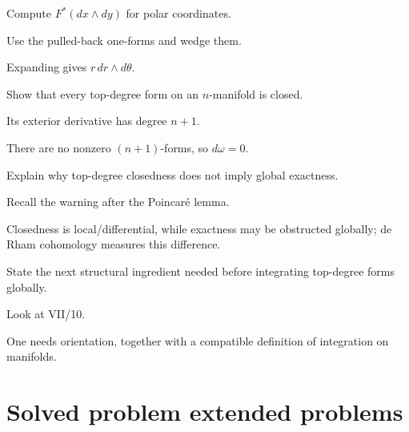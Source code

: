 \begin{exercise}\label{exr:vii09-21}
Compute \(F^*(dx\wedge dy)\) for polar coordinates.
\end{exercise}
\begin{hint}
Use the pulled-back one-forms and wedge them.
\end{hint}
\begin{solution}
Expanding gives \(r\,dr\wedge d\theta\).
\end{solution}

\begin{exercise}\label{exr:vii09-22}
Show that every top-degree form on an \(n\)-manifold is closed.
\end{exercise}
\begin{hint}
Its exterior derivative has degree \(n+1\).
\end{hint}
\begin{solution}
There are no nonzero \((n+1)\)-forms, so \(d\omega=0\).
\end{solution}

\begin{exercise}\label{exr:vii09-23}
Explain why top-degree closedness does not imply global exactness.
\end{exercise}
\begin{hint}
Recall the warning after the Poincaré lemma.
\end{hint}
\begin{solution}
Closedness is local/differential, while exactness may be obstructed globally; de Rham cohomology measures this difference.
\end{solution}

\begin{exercise}\label{exr:vii09-24}
State the next structural ingredient needed before integrating top-degree forms globally.
\end{exercise}
\begin{hint}
Look at VII/10.
\end{hint}
\begin{solution}
One needs orientation, together with a compatible definition of integration on manifolds.
\end{solution}


\section{Solved problem extended problems}

